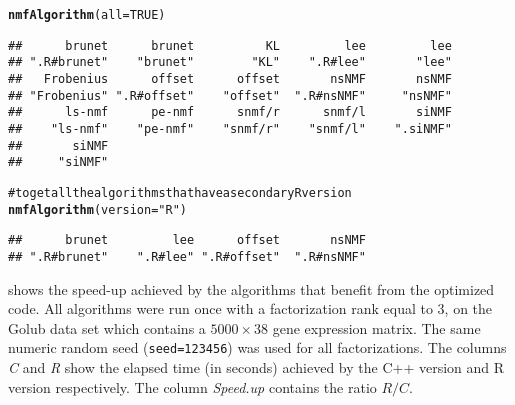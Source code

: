 \documentclass[a4paper]{article}\usepackage{graphicx, color}
\makeatletter
\newcommand{\hlfunctioncall}[1]{\textcolor[rgb]{0.501960784313725,0,0.329411764705882}{\textbf{#1}}}%
\newcommand{\hlstring}[1]{\textcolor[rgb]{0.6,0.6,1}{#1}}%
\newcommand{\hlcomment}[1]{\textcolor[rgb]{0.180392156862745,0.6,0.341176470588235}{#1}}%
\newenvironment{kframe}{%
 \def\at@end@of@kframe{}%
 \ifinner\ifhmode%
  \def\at@end@of@kframe{\end{minipage}}%
  \begin{minipage}{\columnwidth}%
 \fi\fi%
 \def\FrameCommand##1{\hskip\@totalleftmargin \hskip-\fboxsep
 \colorbox{shadecolor}{##1}\hskip-\fboxsep
     \hskip-\linewidth \hskip-\@totalleftmargin \hskip\columnwidth}%
 \MakeFramed {\advance\hsize-\width
   \@totalleftmargin\z@ \linewidth\hsize
   \@setminipage}}%
 {\par\unskip\endMakeFramed%
 \at@end@of@kframe}
\newenvironment{knitrout}{}{} %
\let\code=\texttt
\makeatother
\begin{document}
\begin{knitrout}
\color{fgcolor}\begin{kframe}
\begin{alltt}
\hlfunctioncall{nmfAlgorithm}(all = TRUE)
\end{alltt}
\begin{verbatim}
##      brunet      brunet          KL         lee         lee 
## ".R#brunet"    "brunet"        "KL"    ".R#lee"       "lee" 
##   Frobenius      offset      offset       nsNMF       nsNMF 
## "Frobenius" ".R#offset"    "offset"  ".R#nsNMF"     "nsNMF" 
##      ls-nmf      pe-nmf      snmf/r      snmf/l       siNMF 
##    "ls-nmf"    "pe-nmf"    "snmf/r"    "snmf/l"    ".siNMF" 
##       siNMF 
##     "siNMF"
\end{verbatim}
\begin{alltt}

\hlcomment{# to get all the algorithms that have a secondary R version}
\hlfunctioncall{nmfAlgorithm}(version = \hlstring{"R"})
\end{alltt}
\begin{verbatim}
##      brunet         lee      offset       nsNMF 
## ".R#brunet"    ".R#lee" ".R#offset"  ".R#nsNMF"
\end{verbatim}
\end{kframe}
\end{knitrout}


 shows the speed-up achieved by the algorithms that benefit from the optimized code.
All algorithms were run once with a factorization rank equal to 3, on the Golub data set which contains a $5000\times 38$ gene expression matrix. 
The same numeric random seed (\code{seed=123456}) was used for all factorizations.
The columns \emph{C} and \emph{R} show the elapsed time (in seconds) achieved by the C++ version and R version respectively.
The column \emph{Speed.up} contains the ratio $R/C$. 
\end{document}
